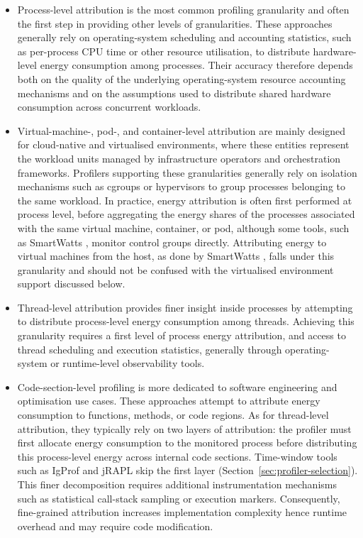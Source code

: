 \documentclass[
  acmsmall,
  screen,
  review,
  xcolor={dvipsnames,usenames}
]{acmart}
\begin{document}
\begin{itemize}
    \item Process-level attribution is the most common profiling granularity and often the first step in providing other levels of granularities. These approaches generally rely on operating-system scheduling and accounting statistics, such as per-process CPU time or other resource utilisation, to distribute hardware-level energy consumption among processes. Their accuracy therefore depends both on the quality of the underlying operating-system resource accounting mechanisms and on the assumptions used to distribute shared hardware consumption across concurrent workloads.
    \item Virtual-machine-, pod-, and container-level attribution are mainly designed for cloud-native and virtualised environments, where these entities represent the workload units managed by infrastructure operators and orchestration frameworks. Profilers supporting these granularities generally rely on isolation mechanisms such as cgroups or hypervisors to group processes belonging to the same workload. In practice, energy attribution is often first performed at process level, before aggregating the energy shares of the processes associated with the same virtual machine, container, or pod, although some tools, such as SmartWatts \cite{fieniSmartWattsSelfCalibratingSoftwareDefined2020}, monitor control groups directly. Attributing energy to virtual machines from the host, as done by SmartWatts \cite{fieniSmartWattsSelfCalibratingSoftwareDefined2020}, falls under this granularity and should not be confused with the virtualised environment support discussed below.
    \item Thread-level attribution provides finer insight inside processes by attempting to distribute process-level energy consumption among threads. Achieving this granularity requires a first level of process energy attribution, and access to thread scheduling and execution statistics, generally through operating-system or runtime-level observability tools.
    \item Code-section-level profiling is more dedicated to software engineering and optimisation use cases. These approaches attempt to attribute energy consumption to functions, methods, or code regions. As for thread-level attribution, they typically rely on two layers of attribution: the profiler must first allocate energy consumption to the monitored process before distributing this process-level energy across internal code sections. Time-window tools such as IgProf \cite{khanEnergyProfilingUsing2015} and jRAPL \cite{liuDataOrientedCharacterizationApplicationLevel2015} skip the first layer (Section~\ref{sec:profiler-selection}). This finer decomposition requires additional instrumentation mechanisms such as statistical call-stack sampling or execution markers. Consequently, fine-grained attribution increases implementation complexity hence runtime overhead and may require code modification.

\end{itemize}
\end{document}
